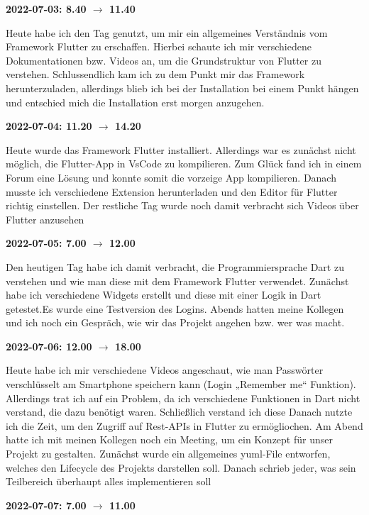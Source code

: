 
\vspace{0.5cm} \textbf{2022-07-03: 8.40 $\rightarrow$ 11.40}

Heute habe ich den Tag genutzt, um mir ein allgemeines Verständnis vom
Framework Flutter zu erschaffen. Hierbei schaute ich mir
verschiedene Dokumentationen bzw. Videos an, um die Grundstruktur von
Flutter zu verstehen. Schlussendlich kam ich zu dem Punkt mir das
Framework herunterzuladen, allerdings blieb ich bei der Installation bei
einem Punkt hängen und entschied mich die Installation erst morgen
anzugehen.

\vspace{0.5cm} \textbf{2022-07-04: 11.20 $\rightarrow$ 14.20}

Heute wurde das Framework Flutter installiert. Allerdings war es
zunächst nicht möglich, die Flutter-App in VsCode zu kompilieren. Zum Glück
fand ich in einem Forum eine Lösung und konnte somit die vorzeige App
kompilieren. Danach musste ich verschiedene Extension herunterladen und den
Editor für Flutter richtig einstellen. Der restliche Tag wurde noch
damit verbracht sich Videos über Flutter anzusehen

\vspace{0.5cm} \textbf{2022-07-05: 7.00 $\rightarrow$ 12.00}

Den heutigen Tag habe ich damit verbracht, die Programmiersprache Dart zu
verstehen und wie man diese mit dem Framework Flutter verwendet.
Zunächst habe ich verschiedene Widgets erstellt und diese mit einer
Logik in Dart getestet.Es wurde eine Testversion des Logins. Abends hatten meine Kollegen und ich noch ein Gespräch, wie
wir das Projekt angehen bzw. wer was macht.

\vspace{0.5cm} \textbf{2022-07-06: 12.00 $\rightarrow$ 18.00}

Heute habe ich mir verschiedene Videos angeschaut, wie man Passwörter
verschlüsselt am Smartphone speichern kann (Login „Remember me``
Funktion). Allerdings trat ich auf ein Problem, da ich verschiedene
Funktionen in Dart nicht verstand, die dazu benötigt waren. Schließlich
verstand ich diese  Danach nutzte ich die Zeit, um den Zugriff auf Rest-APIs in Flutter zu erm\"ogliochen. Am Abend hatte ich mit meinen Kollegen noch ein Meeting, um
ein Konzept für unser Projekt zu gestalten. Zunächst wurde ein
allgemeines yuml-File entworfen, welches den Lifecycle des Projekts
darstellen soll. Danach schrieb jeder, was sein Teilbereich überhaupt
alles implementieren soll

\vspace{0.5cm} \textbf{2022-07-07: 7.00 $\rightarrow$ 11.00}

